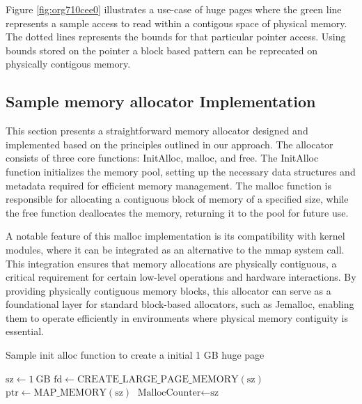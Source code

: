 \documentclass[11pt]{article}
\begin{document}
Figure \ref{fig:org710cee0} illustrates a use-case of huge pages where the green
line represents a sample access to read within a contigous
space of physical memory. The dotted lines represents the
bounds for that particular pointer access. Using bounds
stored on the pointer a block based pattern can be reprecated
on physically contigous memory. 

\subsection{Sample memory allocator Implementation}
\label{sec:org99d3fdd}
This section presents a straightforward memory allocator designed and implemented based on the 
principles outlined in our approach. The allocator consists of three core functions: InitAlloc, 
malloc, and free. The InitAlloc function initializes the memory pool, setting up the necessary 
data structures and metadata required for efficient memory management. The malloc function is 
responsible for allocating a contiguous block of memory of a specified size, while the free 
function deallocates the memory, returning it to the pool for future use.

A notable feature of this malloc implementation is its compatibility with kernel modules, 
where it can be integrated as an alternative to the mmap system call. This integration 
ensures that memory allocations are physically contiguous, a critical requirement for 
certain low-level operations and hardware interactions. By providing physically contiguous 
memory blocks, this allocator can serve as a foundational layer for standard block-based allocators, 
such as Jemalloc, enabling them to operate efficiently in environments where physical memory 
contiguity is essential.

\begin{algorithm}
\caption{Sample init alloc function to create a initial 1 GB huge page}
\label{alg:initAlloc}
\begin{algorithmic}[1]
    \State $\text{sz} \gets 1\ \text{GB}$ 
    \State $\text{fd} \gets \text{CREATE\_LARGE\_PAGE\_MEMORY}(\text{sz})$ 
    \State $\text{ptr} \gets \text{MAP\_MEMORY}(\text{sz})$ 
    \State $\text{MallocCounter} \gets \text{sz}$ 
\EndFunction
\end{algorithmic}
\end{algorithm}
\end{document}
